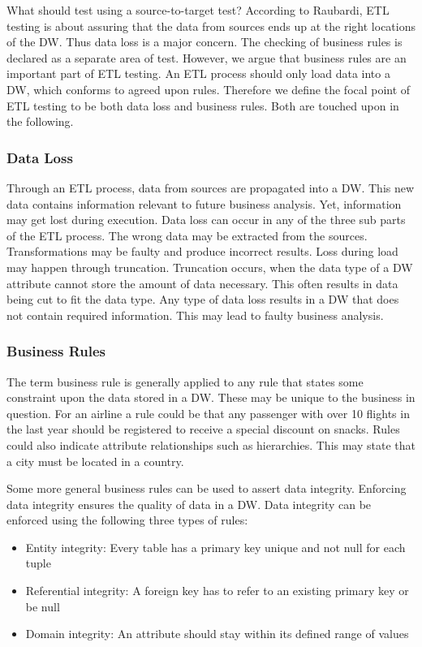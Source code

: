 What should \FW{} test using a source-to-target test? According to Raubardi, ETL testing is about assuring that the data from sources ends up at the right locations of the DW. Thus data loss is a major concern. The checking of business rules is declared as a separate area of test. However, we argue that business rules are an important part of ETL testing. An ETL process should only load data into a DW, which conforms to agreed upon rules. Therefore we define the focal point of ETL testing to be both data loss and business rules. Both are touched upon in the following.

\subsubsection{Data Loss}
Through an ETL process, data from sources are propagated into a DW. This new data contains information relevant to future business analysis. Yet, information may get lost during execution. Data loss can occur in any of the three sub parts of the ETL process. The wrong data may be extracted from the sources. Transformations may be faulty and produce incorrect results. Loss during load may happen through truncation. Truncation occurs, when the data type of a DW attribute cannot store the amount of data necessary. This often results in data being cut to fit the data type. Any type of data loss results in a DW that does not contain required information. This may lead to faulty business analysis.

\subsubsection{Business Rules}
The term business rule is generally applied to any rule that states some constraint upon the data stored in a DW. These may be unique to the business in question. For an airline a rule could be  that any passenger with over 10 flights in the last year should be registered to receive a special discount on snacks. Rules could also indicate attribute relationships such as hierarchies. This may state that a city must be located in a country. 

Some more general business rules can be used to assert data integrity. Enforcing data integrity ensures the quality of data in a DW. Data integrity can be enforced using the following three types of rules:

\begin{itemize}
\item Entity integrity: Every table has a primary key unique and not null for each tuple
\item Referential integrity: A foreign key has to refer to an existing primary key or be null
\item Domain integrity: An attribute should stay within its defined range of values
\end{itemize}


